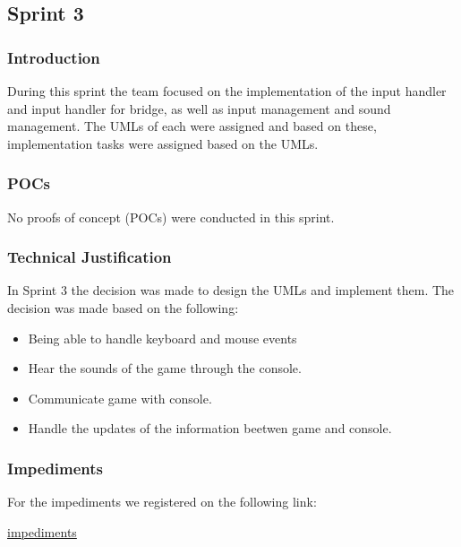 \subsection{Sprint 3}

\subsubsection{Introduction}
During this sprint the team focused on the implementation of the input handler and input handler for bridge, as well as input management and sound management. The UMLs of each were assigned and based on these, implementation tasks were assigned based on the UMLs.

\subsubsection{POCs}

No proofs of concept (POCs) were conducted in this sprint.

\subsubsection{Technical Justification}
In Sprint 3 the decision was made to design the UMLs and implement them. The decision was made based on the following:

\begin{itemize}
    \item  Being able to handle keyboard and mouse events
    \item  Hear the sounds of the game through the console.
    \item  Communicate game with console.
    \item  Handle the updates of the information beetwen game and console.
\end{itemize}

\newpage




\subsubsection{Impediments}
For the impediments we registered on the following link:

\href{https://docs.google.com/spreadsheets/d/1hnMwOOVtyGWhViuAGwBsDpP79jTbHlJ09a_0gc9b4CM/edit?gid=1617748097#gid=1617748097}{impediments}

